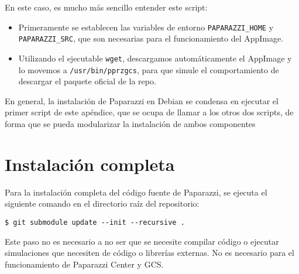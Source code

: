 En este caso, es mucho más sencillo entender este script:

\begin{itemize}
    \item Primeramente se establecen las variables de entorno \texttt{PAPARAZZI\_HOME} y 
    \texttt{PAPARAZZI\_SRC}, que son necesarias para el funcionamiento del AppImage.

    \item Utilizando el ejecutable \texttt{wget}, descargamos automáticamente el AppImage y lo movemos a \texttt{/usr/bin/pprzgcs}, para que simule el comportamiento de descargar el paquete oficial de la repo. 
\end{itemize}

En general, la instalación de Paparazzi en Debian se condensa en ejecutar el primer script de este apéndice, 
que se ocupa de llamar a los otros dos scripts, de forma que se pueda modularizar la instalación de ambos componentes

\section{Instalación completa}

Para la instalación completa del código fuente de Paparazzi, 
se ejecuta el siguiente comando en el directorio raíz del repositorio:

\begin{lstlisting}[style=CodigoBash]
$ git submodule update --init --recursive .
\end{lstlisting}

Este paso no es necesario a no ser que se necesite compilar código o ejecutar simulaciones
que necesiten de código o librerías externas. 
No es necesario para el funcionamiento de Paparazzi Center y GCS.




